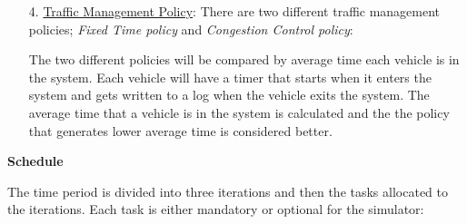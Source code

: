\documentclass[11pt]{article}
\begin{document}
\begin{description}
\begin{itemize}
		\item[4. ] \underline{Traffic Management Policy}: There are two different traffic management policies; \textit{Fixed Time policy} and \textit{Congestion Control policy}:

		
The two different policies will be compared by average time each vehicle is in the system. Each vehicle will have a timer that starts when it enters the system and gets written to a log when the vehicle exits the system. The average time that a vehicle is in the system is calculated and the the policy that generates lower average time is considered better.
		 		
		
	\end{itemize}
\end{description}

\textbf{Schedule}

The time period is divided into three iterations and then the tasks allocated to the iterations. Each task is either mandatory or optional for the simulator:
\end{document}
